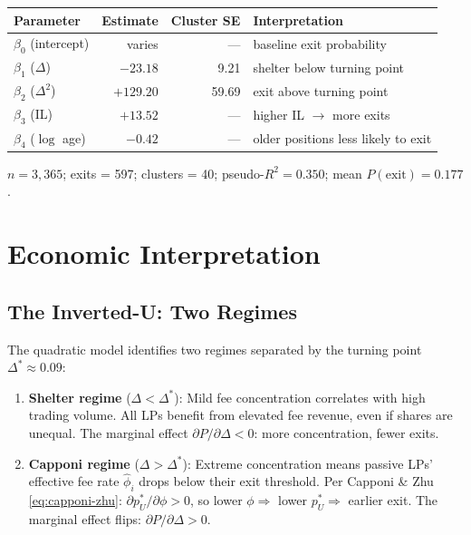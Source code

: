 \documentclass[11pt,a4paper]{article}
\begin{document}
\begin{center}
\begin{tabular}{lrrl}
\toprule
Parameter & Estimate & Cluster SE & Interpretation \\
\midrule
$\beta_0$ (intercept) & varies & --- & baseline exit probability \\
$\beta_1$ ($\Delta$) & $-23.18$ & 9.21 & shelter below turning point \\
$\beta_2$ ($\Delta^2$) & $+129.20$ & 59.69 & exit above turning point \\
$\beta_3$ (IL) & $+13.52$ & --- & higher IL $\to$ more exits \\
$\beta_4$ ($\log$ age) & $-0.42$ & --- & older positions less likely to exit \\
\bottomrule
\end{tabular}
\end{center}

$n = 3{,}365$; exits = 597; clusters = 40; pseudo-$R^2 = 0.350$; mean
$P(\text{exit}) = 0.177$.


\section{Economic Interpretation}\label{sec:interpretation}

\subsection{The Inverted-U: Two Regimes}

The quadratic model identifies two regimes separated by the turning point
$\Delta^* \approx 0.09$:

\begin{enumerate}
  \item \textbf{Shelter regime} ($\Delta < \Delta^*$): Mild fee
        concentration correlates with high trading volume. All LPs
        benefit from elevated fee revenue, even if shares are unequal.
        The marginal effect $\partial P / \partial \Delta < 0$: more
        concentration, fewer exits.

  \item \textbf{Capponi regime} ($\Delta > \Delta^*$): Extreme
        concentration means passive LPs' effective fee rate $\hat\phi_i$
        drops below their exit threshold. Per Capponi \& Zhu
        \eqref{eq:capponi-zhu}: $\partial p_U^* / \partial \phi > 0$, so
        lower $\phi \Rightarrow$ lower $p_U^* \Rightarrow$ earlier exit.
        The marginal effect flips: $\partial P / \partial \Delta > 0$.
\end{enumerate}
\end{document}
